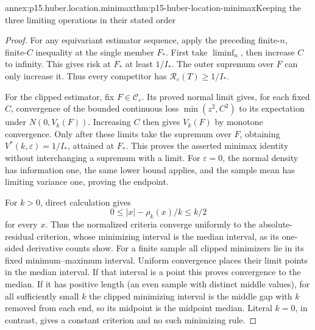 \begin{annexitem}{annex:p15.huber.location.minimax}{thm:p15-huber-location-minimax}{Keeping the three limiting operations in their stated order}
\begin{proof}
For any equivariant estimator sequence, apply the preceding
finite-\(n\), finite-\(C\) inequality at the single member \(F_*\).
First take \(\liminf_n\), then increase \(C\) to infinity.
This gives risk at \(F_*\) at least \(1/I_*\).
The outer supremum over \(F\) can only increase it.
Thus every competitor has \(\mathcal R_\varepsilon(T)\geq1/I_*\).

For the clipped estimator, fix \(F\in\mathcal C_\varepsilon\).
Its proved normal limit gives, for each fixed \(C\), convergence
of the bounded continuous loss \(\min(z^2,C^2)\) to its expectation
under \(N(0,V_k(F))\).
Increasing \(C\) then gives \(V_k(F)\) by monotone convergence.
Only after these limits take the supremum over \(F\), obtaining
\(V^*(k,\varepsilon)=1/I_*\), attained at \(F_*\).
This proves the asserted minimax identity without interchanging
a supremum with a limit.
For \(\varepsilon=0\), the normal density has information one,
the same lower bound applies, and the sample mean has limiting
variance one, proving the endpoint.

For \(k>0\), direct calculation gives
\[
 0\leq |x|-\rho_k(x)/k\leq k/2
\]
for every \(x\). Thus the normalized criteria converge uniformly
to the absolute-residual criterion, whose minimizing interval is
the median interval, as its one-sided derivative counts show.
For a finite sample all clipped minimizers lie in its fixed
minimum--maximum interval. Uniform convergence places their limit
points in the median interval.
If that interval is a point this proves convergence to the median.
If it has positive length (an even sample with distinct middle
values), for all sufficiently small \(k\) the clipped minimizing
interval is the middle gap with \(k\) removed from each end, so
its midpoint is the midpoint median. Literal \(k=0\), in contrast,
gives a constant criterion and no such minimizing rule.
\end{proof}
\end{annexitem}


